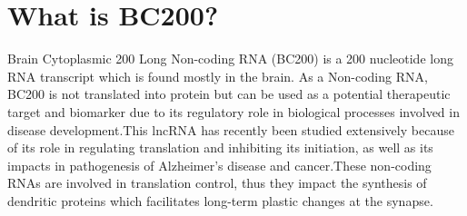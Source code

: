 \documentclass{article}
\begin{document}
\section{What is BC200?}
Brain Cytoplasmic 200 Long Non-coding RNA (BC200) is a 200 nucleotide long RNA transcript which is found mostly in the brain\cite{tiedge1993primary}. As a Non-coding RNA, BC200 is not translated into protein but can be used as a potential therapeutic target and biomarker due to its regulatory role in biological processes involved in disease development\cite{zhang2021role,mus2007dendritic}.This lncRNA has recently been studied extensively because of its role in regulating translation and inhibiting its initiation, as well as its impacts in pathogenesis of Alzheimer's disease and cancer\cite{zhang2021role,tiedge1993primary}.These non-coding RNAs are involved in translation control, thus they impact the synthesis of dendritic proteins which facilitates long-term plastic changes at the synapse.\cite{mus2007dendritic}
\end{document}
